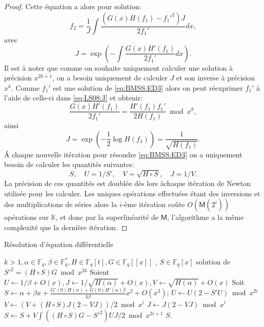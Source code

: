 \documentclass[10pt,a4paper]{book}
\theoremstyle{plain}
\theoremstyle{definition}
\theoremstyle{definition}
\theoremstyle{definition}
\theoremstyle{definition}
\theoremstyle{remark}
\theoremstyle{remark}
\begin{document}
\begin{proof}
 Cette équation a alors pour solution:
\begin{equation}
f_2=\frac{1}{J}\int \frac{(G(x)H(f_1)-f_1'^2)J}{2f_1'} dx,
\end{equation}
avec 
\begin{equation}
\label{eq:LS08:J}
J=\exp \left( -\int \frac{G(x)H'(f_1)}{2f_1'}dx \right).
\end{equation}
Il est à noter que comme on souhaite uniquement calculer une solution à précision $x^{2k+1}$, on a besoin uniquement de calculer $J$ et son inverse à précision $x^k$.
Comme $f_1'$ est une solution de \eqref{eq:BMSS:ED3} alors on peut réexprimer $f_1'$ à l'aide de celle-ci dans \eqref{eq:LS08:J} et obtenir:
\begin{equation}
\frac{G(x)H'(f_1)}{2f_1'}=\frac{H'(f_1)f_1'}{2H(f_1)} \bmod x^k,
\end{equation}
ainsi 
\begin{equation}
J=\exp \left(-\frac{1}{2}\log H(f_1) \right)= \frac{1}{\sqrt{H(f_1)}}.
\end{equation}
\'A chaque nouvelle itération pour résoudre \eqref{eq:BMSS:ED3} on a uniquement besoin de calculer les quantités suivantes:
\begin{equation}
S, \quad U=1/S', \quad V=\sqrt{H \circ S}, \quad J=1/V.
\end{equation}
La précision de ces quantités est doublée dès lors àchaque itération de Newton utilisée pour les calculer. Les uniques opérations effectuées étant des inversions et des multiplications de séries alors la $i$-ème itération coûte $O(\mathsf{M}(2^i))$ opérations sur $\mathbb{K}$, et donc par la superlinéarité de $\mathsf{M}$, l'algorithme a la même complexité que la dernière itération. 
\end{proof}


\begin{algorithm}
\caption{\label{alg:BMSS:eqdiff} Résolution d'équation différentielle}
\begin{algorithmic}[1]
\REQUIRE $k>1, \alpha \in \mathbb{F}_q, \beta \in \mathbb{F}_q^*, H \in \mathbb{F}_q[t], G \in \mathbb{F}_{q}[[x]]$ ,%
\ENSURE $S \in \mathbb{F}_q[x]$ solution de $S'^2=(H \circ S)G \bmod x^{2k}$
\STATE Soient $U \gets 1/\beta + O(x), J \gets 1/\sqrt{H(\alpha)}+O(x), V \gets \sqrt{H(\alpha)} + O(x)$
\STATE Soit $S \gets \alpha + \beta x + \frac{G'(0)H(\alpha)+G(0)H'(\alpha)\beta}{4\beta}x^2+O(x^3)$;
\STATE $U \gets U(2-S'U) \bmod x^{2i}$
\STATE $V \gets (V+(H \circ S)J(2-VJ))/2 \bmod x^{i}$
\STATE $J \gets J(2-VJ) \bmod {x^i}$
\STATE $S \gets S+V \int ((H \circ S)G-S'^2)UJ/2 \bmod x^{2i+1}$
\ENDFOR
\RETURN$S$. 
\end{algorithmic}
\end{algorithm}
\end{document}
